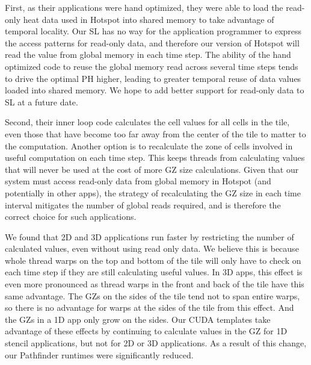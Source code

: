\documentclass[preprint,nocopyrightspace]{styles/sigplanconf}
\begin{document}
First, as their applications were hand optimized, they were able to load the
read-only heat data used in Hotspot into shared memory to take advantage of
temporal locality.  Our SL has no way for the application programmer to express
the access patterns for read-only data, and therefore our version of Hotspot
will read the value from global memory in each time step.  The ability of the
hand optimized code to reuse the global memory read across several time steps
tends to drive the optimal PH higher, leading to greater temporal reuse
of data values loaded into shared memory.
We hope to add better support for read-only data to SL at a future date.

Second, their inner loop code calculates the cell values for all cells in the
tile, even those that have become too far away from the center of the tile to
matter to the computation.  Another option is to recalculate the zone of cells
involved in useful computation on each time step.  This keeps threads from
calculating values that will never be used at the cost of more GZ size
calculations.  Given that our system must access read-only data from global
memory in Hotspot (and potentially in other apps), the strategy of
recalculating the GZ size in each time interval mitigates the number of global
reads required, and is therefore the correct choice for such applications.

We found that 2D and 3D applications run faster by restricting the number of
calculated values, even without using read only data. We believe this is
because whole thread warps on the top and bottom of the tile will only have to
check on each time step if they are still calculating useful values.  In 3D
apps, this effect is even more pronounced as thread warps in the front and back
of the tile have this same advantage.  The GZs on the sides of the tile tend
not to span entire warps, so there is no advantage for warps at the sides of
the tile from this effect.  And the GZs in a 1D app only grow on the sides.
Our CUDA templates take advantage of these effects by continuing to calculate
values in the GZ for 1D stencil applications, but not for 2D or 3D
applications.  As a result of this change, our Pathfinder runtimes were
significantly reduced.
\end{document}

